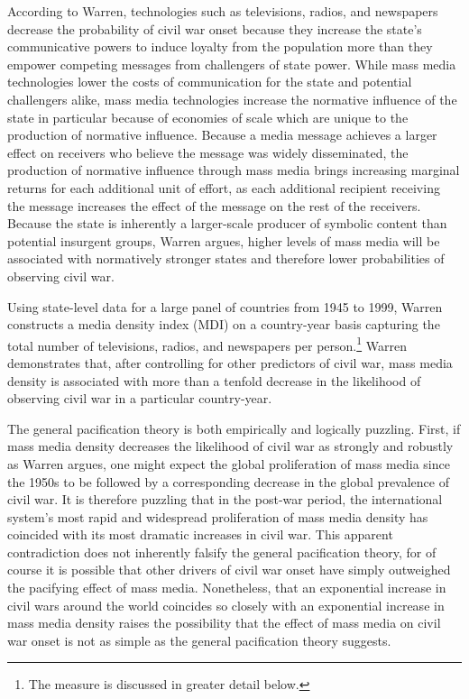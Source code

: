 \documentclass[11pt,article,oneside]{memoir}
\begin{document}
According to Warren, technologies such as televisions, radios, and
newspapers decrease the probability of civil war onset because they
increase the state's communicative powers to induce loyalty from the
population more than they empower competing messages from challengers of
state power. While mass media technologies lower the costs of
communication for the state and potential challengers alike, mass media
technologies increase the normative influence of the state in particular
because of economies of scale which are unique to the production of
normative influence. Because a media message achieves a larger effect on
receivers who believe the message was widely disseminated, the
production of normative influence through mass media brings increasing
marginal returns for each additional unit of effort, as each additional
recipient receiving the message increases the effect of the message on
the rest of the receivers. Because the state is inherently a
larger-scale producer of symbolic content than potential insurgent
groups, Warren argues, higher levels of mass media will be associated
with normatively stronger states and therefore lower probabilities of
observing civil war.

Using state-level data for a large panel of countries from 1945 to 1999,
Warren constructs a media density index (MDI) on a country-year basis
capturing the total number of televisions, radios, and newspapers per
person.\footnote{The measure is discussed in greater detail below.}
Warren demonstrates that, after controlling for other predictors of
civil war, mass media density is associated with more than a tenfold
decrease in the likelihood of observing civil war in a particular
country-year.

The general pacification theory is both empirically and logically
puzzling. First, if mass media density decreases the likelihood of civil
war as strongly and robustly as Warren argues, one might expect the
global proliferation of mass media since the 1950s to be followed by a
corresponding decrease in the global prevalence of civil war. It is
therefore puzzling that in the post-war period, the international
system's most rapid and widespread proliferation of mass media density
has coincided with its most dramatic increases in civil war. This
apparent contradiction does not inherently falsify the general
pacification theory, for of course it is possible that other drivers of
civil war onset have simply outweighed the pacifying effect of mass
media. Nonetheless, that an exponential increase in civil wars around
the world coincides so closely with an exponential increase in mass
media density raises the possibility that the effect of mass media on
civil war onset is not as simple as the general pacification theory
suggests.
\end{document}
